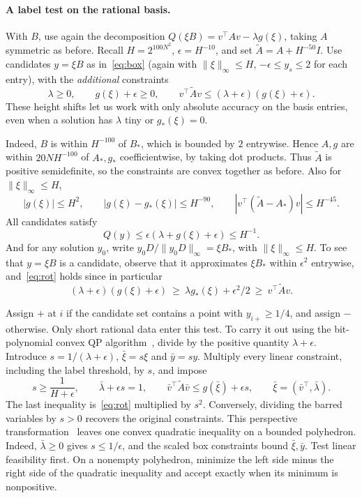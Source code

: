 \paragraph{A label test on the rational basis.}
With \(B\), use again the decomposition
\(Q(\xi B)=v^\top A v-\lambda g(\xi)\),
taking \(A\) symmetric as before. Recall \(H=2^{100N^2}\),
\(\epsilon=H^{-10}\), and set
\(
 \widetilde A=A+H^{-50}I.
\)
Use candidates \(y=\xi B\)
as in~\eqref{eq:box}
(again with \(\|\xi\|_\infty\le H\),
\(-\epsilon\le y_s\le 2\) for each entry),
with the \emph{additional} constraints
\begin{equation}\label{eq:rot}
 \lambda\ge0,\qquad
 g(\xi)+\epsilon\ge0,\qquad
 v^\top \widetilde A v\le(\lambda+\epsilon)(g(\xi)+\epsilon).
\end{equation}
These height shifts let us work with only absolute accuracy on the
basis entries,
even when a solution has \(\lambda\) tiny or \(g_*(\xi)=0\).


Indeed, \(B\) is within \(H^{-100}\) of \(B_*\),
which is bounded by \(2\) entrywise. Hence \(A,g\) are within
\(20NH^{-100}\) of \(A_*,g_*\) coefficientwise, by taking dot
products. Thus \(\widetilde A\) is positive semidefinite,
so the constraints are convex together as before.
Also for \(\|\xi\|_\infty\le H\),
\[
 |g(\xi)|\le H^2,\qquad
 |g(\xi)-g_*(\xi)|\le H^{-90},
 \qquad |v^\top(\widetilde A-A_*)v|\le H^{-45}.
\]
All candidates satisfy
\[
 Q(y)\le \epsilon(\lambda+g(\xi)+\epsilon)\le H^{-1}.
\]
And for any solution \(y_0\), write
\(y_0D/\|y_0D\|_\infty=\xi B_*\), with
\(\|\xi\|_\infty\le H\).
To see that \(y=\xi B\) is a candidate, observe that it approximates \(\xi B_*\) within \(\epsilon^2\)
entrywise, and~\eqref{eq:rot} holds since in particular
\[
 (\lambda+\epsilon)(g(\xi)+\epsilon)
 \ \ge\ \lambda g_*(\xi)+\epsilon^2/2
 \ \ge\ v^\top \widetilde A v.
\]


Assign \(+\) at \(i\) if the candidate set contains a point with
\(y_{i+}\ge1/4\), and assign \(-\) otherwise. Only short rational
data enter this test. To carry it out using the bit-polynomial convex
QP algorithm~\cite{KTK}, divide by the positive quantity
\(\lambda+\epsilon\). Introduce
\(s=1/(\lambda+\epsilon)\), \(\bar\xi=s\xi\) and \(\bar y=sy\).
Multiply every linear constraint, including the label threshold, by
\(s\), and impose
\[
 s\ge\frac{1}{H+\epsilon},\qquad
 \bar\lambda+\epsilon s=1,\qquad
 \bar v^\top\widetilde A\bar v\le g(\bar\xi)+\epsilon s,
 \qquad \bar\xi=(\bar v^\top,\bar\lambda).
\]
The last inequality is~\eqref{eq:rot} multiplied by \(s^2\).
Conversely, dividing the barred variables by \(s>0\) recovers the
original constraints. This perspective transformation~\cite[\S2.3.3]{Boyd}
leaves one convex quadratic inequality on a bounded polyhedron.
Indeed, \(\bar\lambda\ge0\) gives \(s\le1/\epsilon\), and the scaled
box constraints bound \(\bar\xi,\bar y\). Test linear feasibility
first. On a nonempty polyhedron, minimize the left side minus the right
side of the quadratic inequality and accept exactly when its minimum
is nonpositive.

